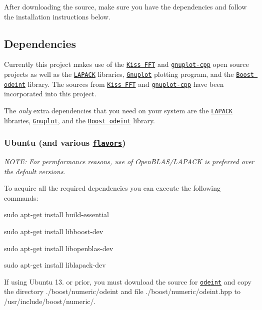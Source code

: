 After downloading the source, make sure you have the dependencies and follow the installation instructions below.

\subsection*{Dependencies}

Currently this project makes use of the \href{http://www.sourceforge.net/projects/kissfft/}{\tt Kiss F\-F\-T} and \href{http://code.google.com/p/gnuplot-cpp/}{\tt gnuplot-\/cpp} open source projects as well as the \href{http://www.netlib.org/lapack/}{\tt L\-A\-P\-A\-C\-K} libraries, \href{http://www.gnuplot.info/}{\tt Gnuplot} plotting program, and the \href{http://www.boost.org/doc/libs/1_54_0/libs/numeric/odeint/doc/html/index.html}{\tt Boost odeint} library. The sources from \href{http://www.sourceforge.net/projects/kissfft/}{\tt Kiss F\-F\-T} and \href{http://code.google.com/p/gnuplot-cpp/}{\tt gnuplot-\/cpp} have been incorporated into this project.

The {\itshape only} extra dependencies that you need on your system are the \href{http://www.netlib.org/lapack/}{\tt L\-A\-P\-A\-C\-K} libraries, \href{http://www.gnuplot.info/}{\tt Gnuplot}, and the \href{http://www.boost.org/doc/libs/1_54_0/libs/numeric/odeint/doc/html/index.html}{\tt Boost odeint} library.

\subsubsection*{Ubuntu (and various \href{https://wiki.ubuntu.com/UbuntuFlavors}{\tt flavors})}

{\itshape N\-O\-T\-E\-: For permformance reasons, use of Open\-B\-L\-A\-S/\-L\-A\-P\-A\-C\-K is preferred over the default versions.}

To acquire all the required dependencies you can execute the following commands\-:

{\ttfamily sudo apt-\/get install build-\/essential}

{\ttfamily sudo apt-\/get install libboost-\/dev}

{\ttfamily sudo apt-\/get install libopenblas-\/dev}

{\ttfamily sudo apt-\/get install liblapack-\/dev}

If using Ubuntu 13. or prior, you must download the source for \href{http://www.odeint.com}{\tt odeint} and copy the directory {\ttfamily ./boost/numeric/odeint} and file {\ttfamily ./boost/numeric/odeint.hpp} to {\ttfamily /usr/include/boost/numeric/}.

